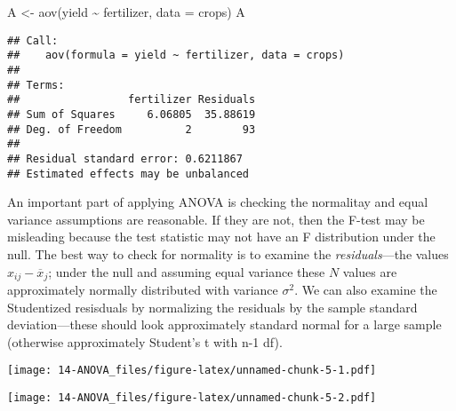 \documentclass[
]{book}
\newenvironment{Shaded}{\begin{snugshade}}{\end{snugshade}}
\newcommand{\AttributeTok}[1]{\textcolor[rgb]{0.77,0.63,0.00}{#1}}
\newcommand{\FunctionTok}[1]{\textcolor[rgb]{0.00,0.00,0.00}{#1}}
\newcommand{\NormalTok}[1]{#1}
\newcommand{\OtherTok}[1]{\textcolor[rgb]{0.56,0.35,0.01}{#1}}
\newcommand{\SpecialCharTok}[1]{\textcolor[rgb]{0.00,0.00,0.00}{#1}}
\begin{document}
\begin{Shaded}
\begin{Highlighting}[]
\NormalTok{A }\OtherTok{\textless{}{-}} \FunctionTok{aov}\NormalTok{(yield }\SpecialCharTok{\textasciitilde{}}\NormalTok{ fertilizer, }\AttributeTok{data =}\NormalTok{ crops)}
\NormalTok{A}
\end{Highlighting}
\end{Shaded}

\begin{verbatim}
## Call:
##    aov(formula = yield ~ fertilizer, data = crops)
## 
## Terms:
##                 fertilizer Residuals
## Sum of Squares     6.06805  35.88619
## Deg. of Freedom          2        93
## 
## Residual standard error: 0.6211867
## Estimated effects may be unbalanced
\end{verbatim}

An important part of applying ANOVA is checking the normalitay and equal variance assumptions are reasonable. If they are not, then the F-test may be misleading because the test statistic may not have an F distribution under the null. The best way to check for normality is to examine the \emph{residuals}---the values \(x_{ij} - \overline x_{j}\); under the null and assuming equal variance these \(N\) values are approximately normally distributed with variance \(\sigma^2\). We can also examine the Studentized resisduals by normalizing the residuals by the sample standard deviation---these should look approximately standard normal for a large sample (otherwise approximately Student's t with n-1 df).

\begin{Shaded}
\end{Shaded}

\texttt{[image: 14-ANOVA\_files/figure-latex/unnamed-chunk-5-1.pdf]}

\begin{Shaded}
\end{Shaded}

\texttt{[image: 14-ANOVA\_files/figure-latex/unnamed-chunk-5-2.pdf]}
\end{document}
